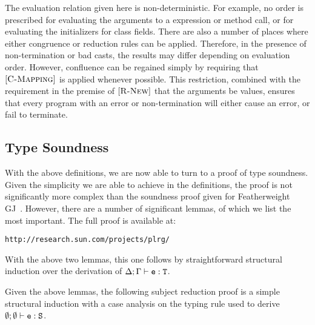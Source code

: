 \documentclass{acm-sigplan}
\begin{document}
The evaluation relation given here is non-deterministic. For example,
no order is prescribed for evaluating the arguments to a {}
expression or method call, or for evaluating the initializers for
class fields.  There are also a number of places where either
congruence or reduction rules can be applied.  Therefore, in the
presence of non-termination or bad casts, the results may differ
depending on evaluation order.  However, confluence can be regained
simply by requiring that $[{\textsc {C-Mapping}}]$ is applied whenever
possible.  This restriction, combined with the requirement in the
premise of $[{\textsc {R-New}}]$ that the arguments be values, ensures
that every program with an error or non-termination will either cause
an error, or fail to terminate.  

\figComp



\subsection{Type Soundness}
\label{proof}

With the above definitions, we are now able to turn to a proof of type
soundness. Given the simplicity we are able to achieve in the
definitions, the proof is not significantly more complex than the
soundness proof given for Featherweight GJ\ \cite{FJ}.  However, there
are a number of significant lemmas, of which we list the most
important. The full proof is available at:

\vspace{.1cm}
\verb|http://research.sun.com/projects/plrg/|

\fieldsPreservedLemma

\fieldsPreservedProof

\methodTypingLemma

\methodTypingProof

\substitutionPreservesTyping
\myProof With the above two lemmas, this one follows by
straightforward structural induction over the derivation of ${\Delta;\Gamma} \vdash {\ensuremath{{\mbox {\tt e}} : {\mathtt{{T}}}}}$.

\vspace{.3cm}

Given the above lemmas, the following subject reduction proof is a
simple structural induction with a case analysis on the typing rule
used to derive ${\emptyset;\emptyset} \vdash {\ensuremath {{\mbox {\tt e}} : {\mbox {\tt S}}}}$.

\preservation

\preservationProof
\end{document}
